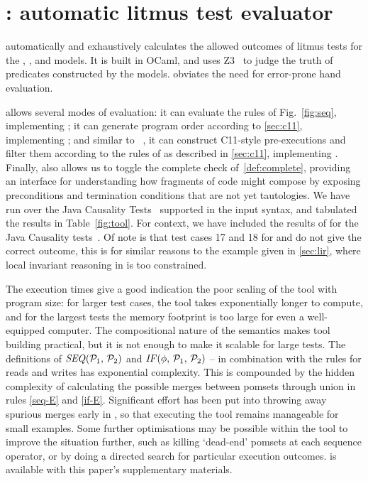\section{\PwTerTITLE: automatic litmus test evaluator}
\label{sec:tool}

\PwTer{} automatically and exhaustively calculates the allowed outcomes of litmus tests for the \PwT, \PwTpo, and \PwTc{} models. It is built in OCaml, and uses Z3~\cite{Z3Solver} to judge the truth of predicates constructed by the models. \PwTer{} obviates the need for error-prone hand evaluation.

\PwTer{} allows several modes of evaluation: it can evaluate the rules of Fig.~\ref{fig:seq}, implementing \PwT; it can generate program order according to \textsection\ref{sec:c11}, implementing \PwTpo; and similar to \MRD~\cite{DBLP:conf/esop/PaviottiCPWOB20}, it can construct C11-style pre-executions and filter them according to the rules of \rcXI{} as described in \textsection\ref{sec:c11}, implementing \PwTc{}.
Finally, \PwTer{} also allows us to toggle the complete check of~\ref{def:complete}, providing an interface for understanding how fragments of code might compose by exposing preconditions and termination conditions that are not yet tautologies.
We have run \PwTer{} over the Java Causality Tests~\cite{PughWebsite} supported in the input syntax, and tabulated the results in Table~\ref{fig:tool}.
For context, we have included the results of \MRD{} for the Java Causality tests~\cite{DBLP:conf/esop/PaviottiCPWOB20}.
Of note is that test cases 17 and 18 for \MRD{} and \MRDRC{} do not give the correct outcome, this is for similar reasons to the example given in \textsection\ref{sec:lir}, where local invariant reasoning in \MRD{} is too constrained.

The execution times give a good indication the poor scaling of the tool with program size: for larger test cases, the tool takes exponentially longer to compute, and for the largest tests the memory footprint is too large for even a well-equipped computer.
The compositional nature of the semantics makes tool building practical, but it is not enough to make it scalable for large tests.
The definitions of $\sSEMI{\aPSS_1}{\aPSS_2}$ and $\sIF{\aForm}\sTHEN\aPSS_1\sELSE\aPSS_2\sFI$ -- in combination with the rules for reads and writes has exponential complexity.
This is compounded by the hidden complexity of calculating the possible merges between pomsets through union in rules \ref{seq-E} and \ref{if-E}.
Significant effort has been put into throwing away spurious merges early in \PwTer, so that executing the tool remains manageable for small examples.
Some further optimisations may be possible within the tool to improve the situation further, such as killing `dead-end' pomsets at each sequence operator, or by doing a directed search for particular execution outcomes.
\PwTer{} is available with this paper's supplementary materials.

